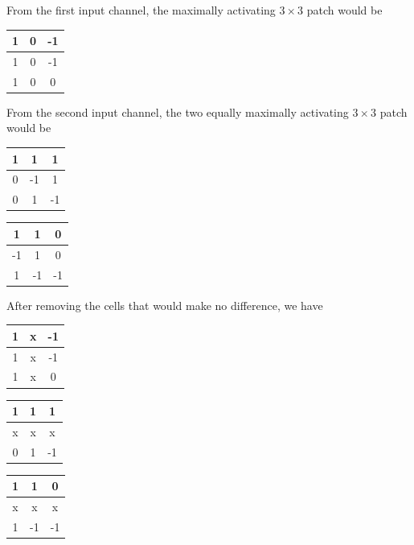 \begin{tcolorbox}[title=Solution]
	From the first input channel, the maximally activating $3 \times 3$ patch would be

	\begin{center}
		\begin{tabular}{|c|c|c|}
			\hline
			1 & 0 & -1 \\ \hline
			1 & 0 & -1 \\ \hline
			1 & 0 & 0  \\ \hline
		\end{tabular}
	\end{center}

	From the second input channel, the two equally maximally activating $3 \times 3$ patch would be

	\begin{center}
		\begin{tabular}{|c|c|c|}
			\hline
			1 & 1  & 1  \\ \hline
			0 & -1 & 1  \\ \hline
			0 & 1  & -1 \\ \hline
		\end{tabular}
		\begin{tabular}{|c|c|c|}
			\hline
			1  & 1  & 0  \\ \hline
			-1 & 1  & 0  \\ \hline
			1  & -1 & -1 \\ \hline
		\end{tabular}
	\end{center}
	After removing the cells that would make no difference, we have
	\begin{center}
		\begin{tabular}{|c|c|c|}
			\hline
			1 & x & -1 \\ \hline
			1 & x & -1 \\ \hline
			1 & x & 0  \\ \hline
		\end{tabular}
		\begin{tabular}{|c|c|c|}
			\hline
			1 & 1 & 1  \\ \hline
			x & x & x  \\ \hline
			0 & 1 & -1 \\ \hline
		\end{tabular}
		\begin{tabular}{|c|c|c|}
			\hline
			1 & 1  & 0  \\ \hline
			x & x  & x  \\ \hline
			1 & -1 & -1 \\ \hline
		\end{tabular}
	\end{center}

\end{tcolorbox}
